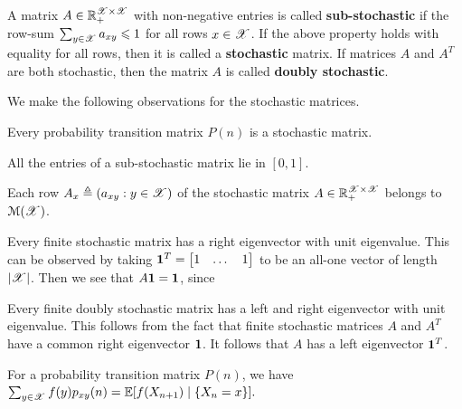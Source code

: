 \documentclass[letterpaper,10pt,english]{article}
\begin{document}
\begin{defn}
A matrix $A \in \mathbb{R}_+^{\mathscr{X} \times \mathscr{X}}$ with non-negative entries is called \textbf{sub-stochastic} if the row-sum $\sum_{y \in \mathscr{X}} a_{xy} \leqslant 1$ for all rows $x \in \mathscr{X}$. 
If the above property holds with equality for all rows, then it is called a \textbf{stochastic} matrix. 
If matrices $A$ and $A^T$ are both stochastic, then the matrix $A$ is called \textbf{doubly stochastic}. 
\end{defn}
\begin{rem} 
We make the following observations for the stochastic matrices. 
\begin{compactenum}[i\_] 
\item Every probability transition matrix $P(n)$ is a stochastic matrix. 
\item All the entries of a sub-stochastic matrix lie in $[0,1]$. 
\item Each row $A_x \triangleq (a_{xy}: y \in \mathscr{X})$ of the stochastic matrix $A \in \mathbb{R}_+^{\mathscr{X} \times \mathscr{X}}$ belongs to $\mathcal{M}(\mathscr{X})$. %
\item Every finite stochastic matrix has a right eigenvector with unit eigenvalue. 
This can be observed by taking $\mathbf{1}^T = \begin{bmatrix}1 & \dots & 1\end{bmatrix}$ to be an all-one vector of length $\left\lvert\mathscr{X}\right\rvert$. 
Then we see that $A \mathbf{1} = \mathbf{1}$, since 
\item Every finite doubly stochastic matrix has a left and right eigenvector with unit eigenvalue. 
This follows from the fact that finite stochastic matrices $A$ and $A^T$ have a common right eigenvector $\mathbf{1}$. 
It follows that $A$ has a left eigenvector $\mathbf{1}^T$. 
\item For a probability transition matrix $P(n)$, we have 
$
\sum_{y \in \mathscr{X}}f(y)p_{xy}(n) = \mathbb{E}[f(X_{n+1})\mid\left\{X_n =x\right\}].  
$ 
\end{compactenum}
\end{rem}
\end{document}
